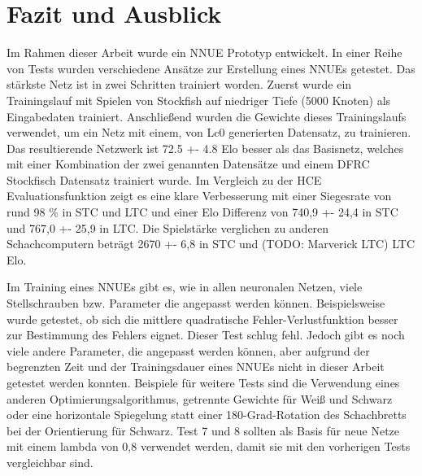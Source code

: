 \chapter{Fazit und Ausblick}

Im Rahmen dieser Arbeit wurde ein \ac{NNUE} Prototyp entwickelt. In einer Reihe von Tests wurden verschiedene Ansätze zur Erstellung eines \acp{NNUE} getestet. Das stärkste Netz ist in zwei Schritten trainiert worden. Zuerst wurde ein Trainingslauf mit Spielen von Stockfish auf niedriger Tiefe (5000 Knoten) als Eingabedaten trainiert. Anschließend wurden die Gewichte dieses Trainingslaufs verwendet, um ein Netz mit einem, von \ac{Lc0} generierten Datensatz, zu trainieren. Das resultierende Netzwerk ist 72.5 +- 4.8 Elo besser als das Basisnetz, welches mit einer Kombination der zwei genannten Datensätze und einem \ac{DFRC} Stockfisch Datensatz trainiert wurde. Im Vergleich zu der \ac{HCE} Evaluationsfunktion zeigt es eine klare Verbesserung mit einer Siegesrate von rund 98 \% in \ac{STC} und \ac{LTC} und einer Elo Differenz von 740,9 +- 24,4 in \ac{STC} und 767,0 +- 25,9 in \ac{LTC}. Die Spielstärke verglichen zu anderen Schachcomputern beträgt 2670 +- 6,8 in \ac{STC} und (TODO: Marverick LTC) \ac{LTC} Elo.

Im Training eines \acp{NNUE} gibt es, wie in allen neuronalen Netzen, viele Stellschrauben bzw. Parameter die angepasst werden können. Beispielsweise wurde getestet, ob sich die mittlere quadratische Fehler-Verlustfunktion besser zur Bestimmung des Fehlers eignet. Dieser Test schlug fehl. Jedoch gibt es noch viele andere Parameter, die angepasst werden können, aber aufgrund der begrenzten Zeit und der Trainingsdauer eines \acp{NNUE} nicht in dieser Arbeit getestet werden konnten. Beispiele für weitere Tests sind \zb{} die Verwendung eines anderen Optimierungsalgorithmus, getrennte Gewichte für Weiß und Schwarz oder eine horizontale Spiegelung statt einer 180-Grad-Rotation des Schachbretts bei der Orientierung für Schwarz. Test 7 und 8 sollten als Basis für neue Netze mit einem lambda von 0,8 verwendet werden, damit sie mit den vorherigen Tests vergleichbar sind.

